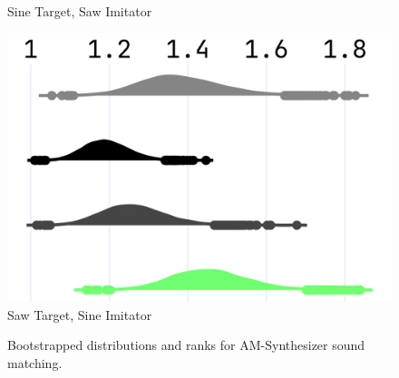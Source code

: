 \begin{figure}[t]
\begin{minipage}[t]{\textwidth}
\begin{minipage}[t]{0.91\textwidth}
\begin{minipage}[t]{0.31\textwidth}
        \vspace{0.3em}
        \footnotesize Sine Target, Saw Imitator
      \end{minipage}
      \hspace{0.01\textwidth}%
      \begin{minipage}[t]{0.31\textwidth}
        \centering
        \includegraphics[width=\linewidth]{images/npsk_ood_P_Loss_2.png}
        \vspace{0.3em}
        \footnotesize Saw Target, Sine Imitator
      \end{minipage}
    \end{minipage}
  \end{minipage}
  \caption{Bootstrapped distributions and ranks for AM-Synthesizer sound matching.}
  \label{fig:npsk_am_synths}
\end{figure}
